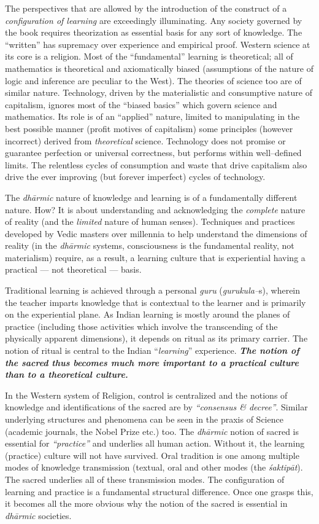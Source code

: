 The perspectives that are allowed by the introduction of the construct of a \textit{configuration of learning} are exceedingly illuminating. Any society governed by the book requires theorization as essential basis for any sort of knowledge. The “written” has supremacy over experience and empirical proof. Western science at its core is a religion. Most of the “fundamental” learning is theoretical; all of mathematics is theoretical and axiomatically biased (assumptions of the nature of logic and inference are peculiar to the West). The theories of science too are of similar nature. Technology, driven by the materialistic and consumptive nature of capitalism, ignores most of the “biased basics” which govern science and mathematics. Its role is of an “applied” nature, limited to manipulating in the best possible manner (profit motives of capitalism) some principles (however incorrect) derived from \textit{theoretical} science. Technology does not promise or guarantee perfection or universal correctness, but performs within well–defined limits. The relentless cycles of consumption and waste that drive capitalism also drive the ever improving (but forever imperfect) cycles of technology.

The \textit{dhārmic} nature of knowledge and learning is of a fundamentally different nature. How? It is about understanding and acknowledging the \textit{complete} nature of reality (and the \textit{limited} nature of human senses). Techniques and practices developed by Vedic masters over millennia to help understand the dimensions of reality (in the \textit{dhārmic} systems, consciousness is the fundamental reality, not materialism) require, as a result, a learning culture that is experiential having a practical — not theoretical — basis.

Traditional learning is achieved through a personal \textit{guru} (\textit{gurukula–}s), wherein the teacher imparts knowledge that is contextual to the learner and is primarily on the experiential plane. As Indian learning is mostly around the planes of practice (including those activities which involve the transcending of the physically apparent dimensions), it depends on ritual as its primary carrier. The notion of ritual is central to the Indian “\textit{learning}” experience. \textbf{\textit{The notion of the sacred thus becomes much more important to a practical culture than to a theoretical culture.}}

In the Western system of Religion, control is centralized and the notions of knowledge and identifications of the sacred are by \textit{“consensus \& decree”}. Similar underlying structures and phenomena can be seen in the praxis of Science (academic journals, the Nobel Prize etc.) too. The \textit{dhārmic} notion of sacred is essential for \textit{“practice”} and underlies all human action. Without it, the learning (practice) culture will not have survived. Oral tradition is one among multiple modes of knowledge transmission (textual, oral and other modes (the \textit{śaktipāt}). The sacred underlies all of these transmission modes. The configuration of learning and practice is a fundamental structural difference. Once one grasps this, it becomes all the more obvious why the notion of the sacred is essential in \textit{dhārmic} societies.

